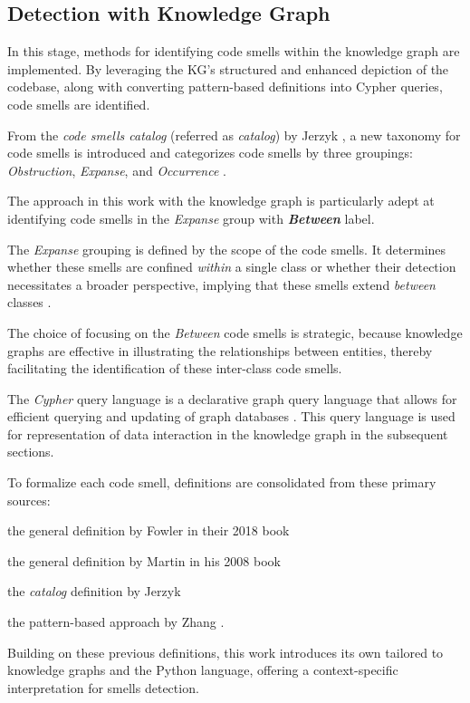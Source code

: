 \subsection{Detection with Knowledge Graph}
In this stage, methods for identifying code smells within the knowledge graph are implemented. By leveraging the KG's structured and enhanced depiction of the codebase, along with converting pattern-based definitions into Cypher queries, code smells are identified.


From the \textit{code smells catalog} (referred as \textit{catalog}) by Jerzyk \etal, a new taxonomy for code smells is introduced and categorizes code smells by three groupings: \textit{Obstruction}, \textit{Expanse}, and \textit{Occurrence} \cite{Jerzyk_2023}. 

The approach in this work with the knowledge graph is particularly adept at identifying code smells in the \textit{Expanse} group with \textit{\textbf{Between}} label. 

The \textit{Expanse} grouping is defined by the scope of the code smells. It determines whether these smells are confined \textit{within} a single class or whether their detection necessitates a broader perspective, implying that these smells extend \textit{between} classes \cite{Jerzyk_2023}.

The choice of focusing on the \textit{Between} code smells is strategic, because knowledge graphs are effective in illustrating the relationships between entities, thereby facilitating the identification of these inter-class code smells.


The \textit{Cypher} query language is a declarative graph query language that allows for efficient querying and updating of graph databases \cite{neo4j_cypher_overview}. This query language is used for representation of data interaction in the knowledge graph in the subsequent sections.


To formalize each code smell, definitions are consolidated from these primary sources: 
\begin{enumerate*}[label={\alph*)},font={\color{cyan!50!black}\bfseries}]
\item the general definition by Fowler \etal in their 2018 book \cite{Martin_2018}
\item the general definition by Martin in his 2008 book \cite{Martin_2008}
\item the \textit{catalog} definition by Jerzyk \etal \cite{Jerzyk_2023}
\item the pattern-based approach by Zhang \etal \cite{Zhang_2008}.
\end{enumerate*}
Building on these previous definitions, this work introduces its own tailored to knowledge graphs and the Python language, offering a context-specific interpretation for smells detection.


